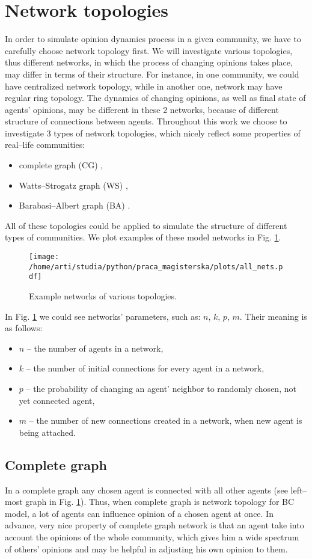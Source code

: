 \documentclass[a4paper, 12pt]{article}
\begin{document}
\section{Network topologies}
In order to simulate opinion dynamics process in a given community, we have to carefully choose network topology first. We will investigate various topologies, thus different networks, in which the process of changing opinions takes place, may differ in terms of their structure. For instance, in one community, we could have centralized network topology, while in another one, network may have regular ring topology. The dynamics of changing opinions, as well as final state of agents' opinions, may be different in these 2 networks, because of different structure of connections between agents. Throughout this work we choose to investigate 3 types of network topologies, which nicely reflect some properties of real--life communities:
\begin{itemize}
\item complete graph (CG) \cite{cg},
\item Watts--Strogatz graph (WS) \cite{ws},
\item Barabasi--Albert graph (BA) \cite{ba}.
\end{itemize}
All of these topologies could be applied to simulate the structure of different types of communities. We plot examples of these model networks in Fig. \ref{nets}.

\begin{figure}[H]
		\centering
		\texttt{[image: /home/arti/studia/python/praca\_magisterska/plots/all\_nets.pdf]}
		\caption{Example networks of various topologies.}
		\label{nets}
\end{figure}

In Fig. \ref{nets} we could see networks' parameters, such as: $n$, $k$, $p$, $m$. Their meaning is as follows:
\begin{itemize}
\item $n$ -- the number of agents in a network,
\item $k$ -- the number of initial connections for every agent in a network,
\item $p$ -- the probability of changing an agent' neighbor to randomly chosen, not yet connected agent,
\item $m$ -- the number of new connections created in a network, when new agent is being attached.
\end{itemize}

\subsection{Complete graph}
In a complete graph any chosen agent is connected with all other agents (see left--most graph in Fig. \ref{nets}). Thus, when complete graph is network topology for BC model, a lot of agents can influence opinion of a chosen agent at once. In advance, very nice property of complete graph network is that an agent take into account the opinions of the whole community, which gives him a wide spectrum of others' opinions and may be helpful in adjusting his own opinion to them. 
\indent
\end{document}
